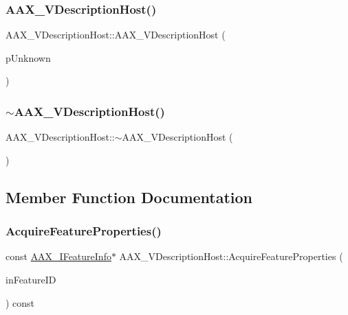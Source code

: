 \subsubsection{\texorpdfstring{AAX\_VDescriptionHost()}{AAX\_VDescriptionHost()}}
{\footnotesize\ttfamily A\+A\+X\+\_\+\+V\+Description\+Host\+::\+A\+A\+X\+\_\+\+V\+Description\+Host (\begin{DoxyParamCaption}\item[{\mbox{\hyperlink{a01409}{I\+A\+C\+F\+Unknown}} $\ast$}]{p\+Unknown }\end{DoxyParamCaption})\hspace{0.3cm}{\ttfamily [explicit]}}

\mbox{\label{a01909_a324ef2cc3258247f19ce8b758b196f8a}} 
\subsubsection{\texorpdfstring{$\sim$AAX\_VDescriptionHost()}{~AAX\_VDescriptionHost()}}
{\footnotesize\ttfamily A\+A\+X\+\_\+\+V\+Description\+Host\+::$\sim$\+A\+A\+X\+\_\+\+V\+Description\+Host (\begin{DoxyParamCaption}{ }\end{DoxyParamCaption})}



\subsection{Member Function Documentation}
\mbox{\label{a01909_a60edaf5e2fff55315bc0c3ecb9a86118}} 
\subsubsection{\texorpdfstring{AcquireFeatureProperties()}{AcquireFeatureProperties()}}
{\footnotesize\ttfamily const \mbox{\hyperlink{a01829}{A\+A\+X\+\_\+\+I\+Feature\+Info}}$\ast$ A\+A\+X\+\_\+\+V\+Description\+Host\+::\+Acquire\+Feature\+Properties (\begin{DoxyParamCaption}\item[{const \mbox{\hyperlink{a00392_a53d6cf8a08224b3e813333e411ce798e}{A\+A\+X\+\_\+\+Feature\+\_\+\+U\+ID}} \&}]{in\+Feature\+ID }\end{DoxyParamCaption}) const\hspace{0.3cm}{\ttfamily [virtual]}}





